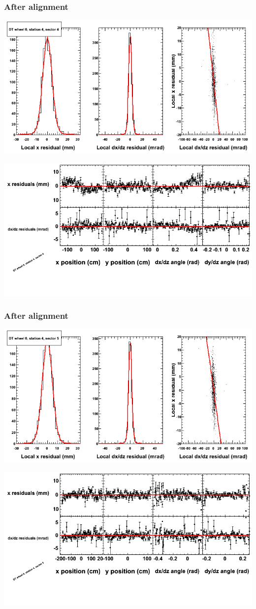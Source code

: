 \documentclass[compress]{beamer}
\begin{document}
\begin{frame}
\frametitle{After alignment}
\includegraphics[width=0.7\linewidth]{NOV4_fitfunctions/MBwhCst4sec04_bellcurves.png}

\includegraphics[width=0.7\linewidth]{NOV4_fitfunctions/MBwhCst4sec04_polynomials.png}
\end{frame}

\begin{frame}
\frametitle{After alignment}
\includegraphics[width=0.7\linewidth]{NOV4_fitfunctions/MBwhCst4sec05_bellcurves.png}

\includegraphics[width=0.7\linewidth]{NOV4_fitfunctions/MBwhCst4sec05_polynomials.png}
\end{frame}
\end{document}
